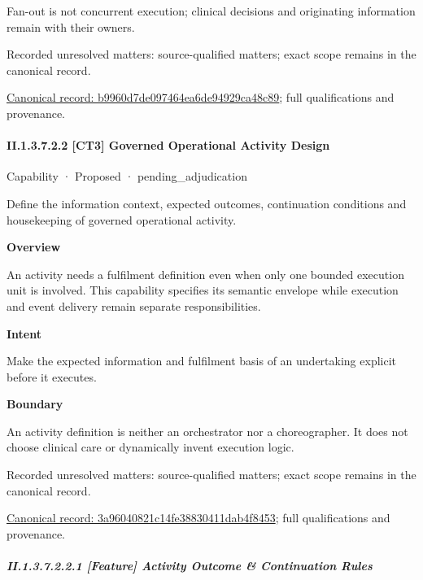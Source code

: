 Fan-out is not concurrent execution; clinical decisions and originating information remain with their owners.


{\small Recorded unresolved matters: source-qualified matters; exact scope remains in the canonical record.}\par
{\footnotesize \href{../../../../continuum/strategy/capability/feature/b9960d7de097464ea6de94929ca48c89.md}{Canonical record: b9960d7de097464ea6de94929ca48c89}; full qualifications and provenance.}\par
\paragraph*{II.1.3.7.2.2 [CT3] Governed Operational Activity Design}
\label{navigation:II.1.3.7.2.2}

\label{element:3a96040821c14fe38830411dab4f8453}
{\small Capability · Proposed · pending\_adjudication}\par

Define the information context, expected outcomes, continuation conditions and housekeeping of governed operational activity.



\textbf{Overview}



An activity needs a fulfilment definition even when only one bounded execution unit is involved. This capability specifies its semantic envelope while execution and event delivery remain separate responsibilities.



\textbf{Intent}



Make the expected information and fulfilment basis of an undertaking explicit before it executes.



\textbf{Boundary}



An activity definition is neither an orchestrator nor a choreographer. It does not choose clinical care or dynamically invent execution logic.


{\small Recorded unresolved matters: source-qualified matters; exact scope remains in the canonical record.}\par
{\footnotesize \href{../../../../continuum/strategy/capability/3a96040821c14fe38830411dab4f8453.md}{Canonical record: 3a96040821c14fe38830411dab4f8453}; full qualifications and provenance.}\par
\subparagraph*{II.1.3.7.2.2.1 [Feature] Activity Outcome \& Continuation Rules}
\label{navigation:II.1.3.7.2.2.1}

